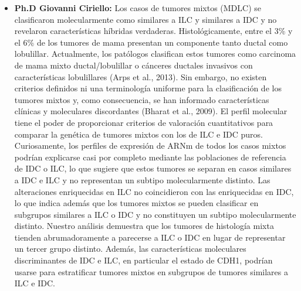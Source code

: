\begin{itemize}[label=\PencilRightDown]
	
	\item \textbf{Ph.D Giovanni Ciriello:} Los casos de tumores mixtos (MDLC) se clasificaron molecularmente como similares a ILC y similares a IDC y no revelaron características híbridas verdaderas. Histológicamente, entre el 3\% y el 6\% de los tumores de mama presentan un componente tanto ductal como lobulillar. Actualmente, los patólogos clasifican estos tumores como carcinoma de mama mixto ductal/lobulillar o cánceres ductales invasivos con características lobulillares (Arps et al., 2013). Sin embargo, no existen criterios definidos ni una terminología uniforme para la clasificación de los tumores mixtos y, como consecuencia, se han informado características clínicas y moleculares discordantes (Bharat et al., 2009). El perfil molecular tiene el poder de proporcionar criterios de valoración cuantitativos para comparar la genética de tumores mixtos con los de ILC e IDC puros. Curiosamente, los perfiles de expresión de ARNm de todos los casos mixtos podrían explicarse casi por completo mediante las poblaciones de referencia de IDC o ILC, lo que sugiere que estos tumores se separan en casos similares a IDC e ILC y no representan un subtipo molecularmente distinto. Las alteraciones enriquecidas en ILC no coincidieron con las enriquecidas en IDC, lo que indica además que los tumores mixtos se pueden clasificar en subgrupos similares a ILC o IDC y no constituyen un subtipo molecularmente distinto. Nuestro análisis demuestra que los tumores de histología mixta tienden abrumadoramente a parecerse a ILC o IDC en lugar de representar un tercer grupo distinto. Además, las características moleculares discriminantes de IDC e ILC, en particular el estado de CDH1, podrían usarse para estratificar tumores mixtos en subgrupos de tumores similares a ILC e IDC\cite{Ciriello2015}.

\end{itemize}

